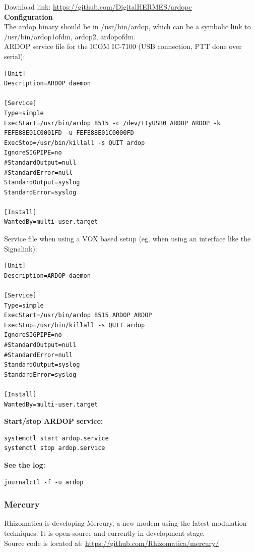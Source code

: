 \documentclass[11pt,a4paper]{article}
\begin{document}
Download link: \url{https://github.com/DigitalHERMES/ardopc}\\

\textbf{Configuration}\\

The ardop binary should be in /usr/bin/ardop, which can be a
symbolic link to /usr/bin/{ardop1ofdm, ardop2, ardopofdm}.\\

ARDOP service file for the ICOM IC-7100 (USB connection, PTT done over serial):
\begin{verbatim}
[Unit]
Description=ARDOP daemon

[Service]
Type=simple
ExecStart=/usr/bin/ardop 8515 -c /dev/ttyUSB0 ARDOP ARDOP -k FEFE88E01C0001FD -u FEFE88E01C0000FD
ExecStop=/usr/bin/killall -s QUIT ardop
IgnoreSIGPIPE=no
#StandardOutput=null
#StandardError=null
StandardOutput=syslog
StandardError=syslog

[Install]
WantedBy=multi-user.target
\end{verbatim}

Service file when using a VOX based setup (eg. when using an interface like
the Signalink):
\begin{verbatim}
[Unit]
Description=ARDOP daemon

[Service]
Type=simple
ExecStart=/usr/bin/ardop 8515 ARDOP ARDOP
ExecStop=/usr/bin/killall -s QUIT ardop
IgnoreSIGPIPE=no
#StandardOutput=null
#StandardError=null
StandardOutput=syslog
StandardError=syslog

[Install]
WantedBy=multi-user.target
\end{verbatim}


\textbf{Start/stop ARDOP service:}
\begin{verbatim}
systemctl start ardop.service
systemctl stop ardop.service
\end{verbatim}


\textbf{See the log:}
\begin{verbatim}
journalctl -f -u ardop
\end{verbatim}

\subsubsection{Mercury}
Rhizomatica is developing Mercury, a new modem using the latest modulation techniques. It is open-source and currently in development stage. \\
Source code is located at:
\url{https://github.com/Rhizomatica/mercury/}
\end{document}
